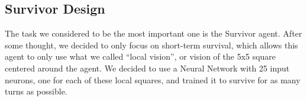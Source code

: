 \subsection{Survivor Design}
\label{subsec:survivor-design}
The task we considered to be the most important one is the Survivor agent.
After some thought, we decided to only focus on short-term survival, which allows this agent to only use what we called
\enquote{local vision}, or vision of the 5x5 square centered around the agent.
We decided to use a Neural Network with 25 input neurons, one for each of these local squares, and trained it to survive
for as many turns as possible.

